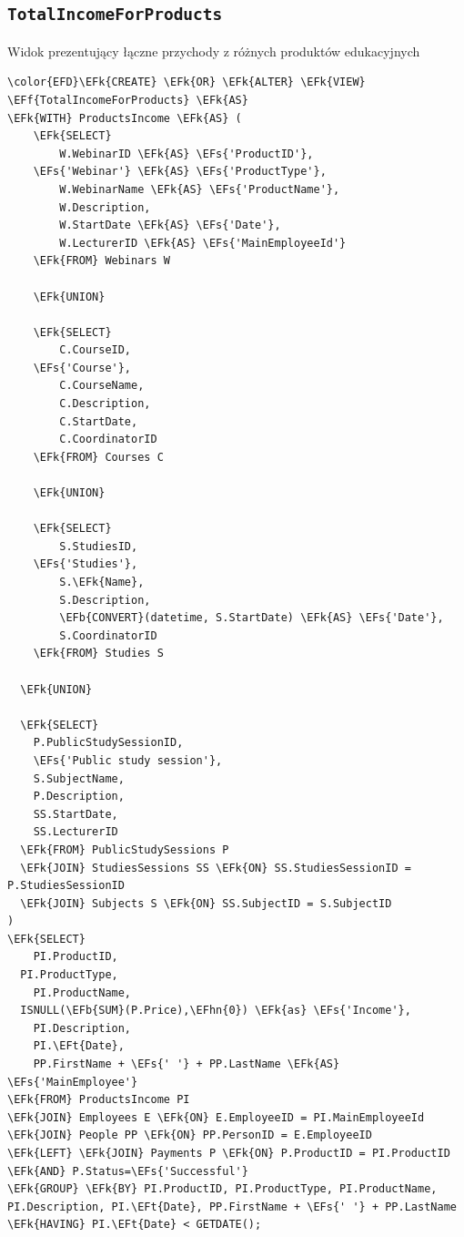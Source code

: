 \documentclass[11pt]{article}
\newcommand{\EFs}[1]{\textcolor{EFs}{#1}} %
\newcommand{\EFk}[1]{\textcolor{EFk}{\textbf{#1}}} %
\newcommand{\EFb}[1]{\textcolor{EFb}{\textbf{#1}}} %
\newcommand{\EFf}[1]{\textcolor{EFf}{#1}} %
\newcommand{\EFt}[1]{\textcolor{EFt}{\textbf{#1}}} %
\newcommand{\EFhn}[1]{\textcolor{EFhn}{#1}} %
\begin{document}
\subsection{\texttt{TotalIncomeForProducts}}
\label{sec:orgdb43d1a}
Widok prezentujący łączne przychody z różnych produktów edukacyjnych
\begin{Code}
\begin{Verbatim}
\color{EFD}\EFk{CREATE} \EFk{OR} \EFk{ALTER} \EFk{VIEW} \EFf{TotalIncomeForProducts} \EFk{AS}
\EFk{WITH} ProductsIncome \EFk{AS} (
    \EFk{SELECT} 
        W.WebinarID \EFk{AS} \EFs{'ProductID'},
    \EFs{'Webinar'} \EFk{AS} \EFs{'ProductType'},
        W.WebinarName \EFk{AS} \EFs{'ProductName'},
        W.Description,
        W.StartDate \EFk{AS} \EFs{'Date'},
        W.LecturerID \EFk{AS} \EFs{'MainEmployeeId'}
    \EFk{FROM} Webinars W

    \EFk{UNION}

    \EFk{SELECT} 
        C.CourseID,
    \EFs{'Course'},
        C.CourseName,
        C.Description,
        C.StartDate,
        C.CoordinatorID
    \EFk{FROM} Courses C

    \EFk{UNION}

    \EFk{SELECT} 
        S.StudiesID,
    \EFs{'Studies'},
        S.\EFk{Name},
        S.Description,
        \EFb{CONVERT}(datetime, S.StartDate) \EFk{AS} \EFs{'Date'},
        S.CoordinatorID
    \EFk{FROM} Studies S

  \EFk{UNION}

  \EFk{SELECT} 
    P.PublicStudySessionID,
    \EFs{'Public study session'},
    S.SubjectName,
    P.Description,
    SS.StartDate,
    SS.LecturerID
  \EFk{FROM} PublicStudySessions P
  \EFk{JOIN} StudiesSessions SS \EFk{ON} SS.StudiesSessionID = P.StudiesSessionID
  \EFk{JOIN} Subjects S \EFk{ON} SS.SubjectID = S.SubjectID
)
\EFk{SELECT} 
    PI.ProductID,
  PI.ProductType,
    PI.ProductName,
  ISNULL(\EFb{SUM}(P.Price),\EFhn{0}) \EFk{as} \EFs{'Income'},
    PI.Description,
    PI.\EFt{Date},
    PP.FirstName + \EFs{' '} + PP.LastName \EFk{AS} \EFs{'MainEmployee'}
\EFk{FROM} ProductsIncome PI
\EFk{JOIN} Employees E \EFk{ON} E.EmployeeID = PI.MainEmployeeId
\EFk{JOIN} People PP \EFk{ON} PP.PersonID = E.EmployeeID
\EFk{LEFT} \EFk{JOIN} Payments P \EFk{ON} P.ProductID = PI.ProductID \EFk{AND} P.Status=\EFs{'Successful'}
\EFk{GROUP} \EFk{BY} PI.ProductID, PI.ProductType, PI.ProductName, PI.Description, PI.\EFt{Date}, PP.FirstName + \EFs{' '} + PP.LastName
\EFk{HAVING} PI.\EFt{Date} < GETDATE();
\end{Verbatim}
\end{Code}
\end{document}
